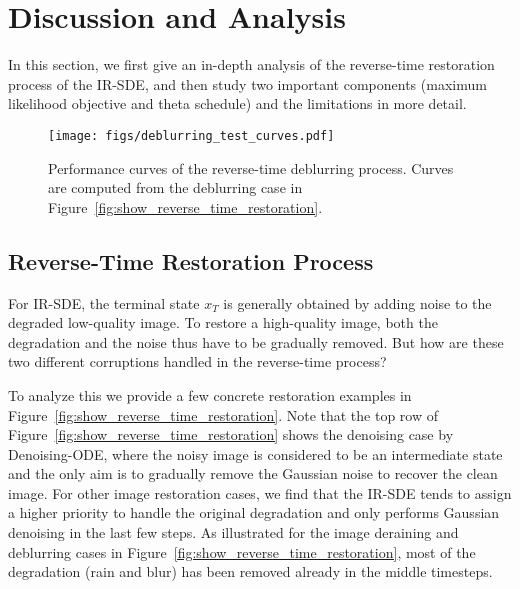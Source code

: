 \documentclass{article}
\theoremstyle{plain}
\theoremstyle{definition}
\theoremstyle{remark}
\begin{document}
 



\section{Discussion and Analysis}
\label{section:discussion}

In this section, we first give an in-depth analysis of the reverse-time restoration process of the IR-SDE, and then study two important components (maximum likelihood objective and theta schedule) and the limitations in more detail.


\begin{figure}[b]
\begin{center}
\centerline{\texttt{[image: figs/deblurring\_test\_curves.pdf]}}\vspace{-2.0mm}
\caption{Performance curves of the reverse-time deblurring process. Curves are computed from the deblurring case in Figure~\ref{fig:show_reverse_time_restoration}.
}
\label{fig:deblurring_test_curve}
\end{center}
\vskip -0.2in
\end{figure}



\subsection{Reverse-Time Restoration Process}

For IR-SDE, the terminal state ${x}_T$ is generally obtained by adding noise to the degraded low-quality image. To restore a high-quality image, both the degradation and the noise thus have to be gradually removed. But how are these two different corruptions handled in the reverse-time process?

To analyze this we provide a few concrete restoration examples in Figure~\ref{fig:show_reverse_time_restoration}. Note that the top row of Figure~\ref{fig:show_reverse_time_restoration} shows the denoising case by Denoising-ODE, where the noisy image is considered to be an intermediate state and the only aim is to gradually remove the Gaussian noise to recover the clean image. For other image restoration cases, we find that the IR-SDE tends to assign a higher priority to handle the original degradation and only performs Gaussian denoising in the last few steps. As illustrated for the image deraining and deblurring cases in Figure~\ref{fig:show_reverse_time_restoration}, most of the degradation (rain and blur) has been removed already in the middle timesteps.
\end{document}
